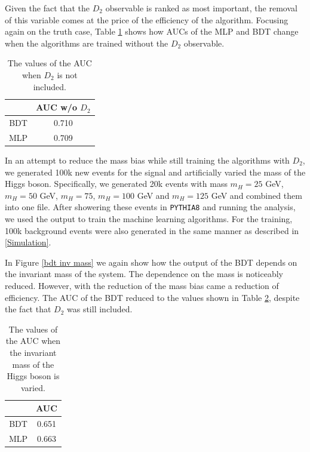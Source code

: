 \documentclass[10pt,a4paper]{book}
\def\code#1{\texttt{#1}}
\begin{document}
Given the fact that the $D_2$ observable is ranked as most important, the removal of this variable comes at the price of the efficiency of the algorithm. Focusing again on the truth case, Table \ref{AUC table no d2} shows how AUCs of the MLP and BDT change when the algorithms are trained without the $D_2$ observable.

\begin{table}[h!]
\centering
\begin{tabular}{|c|c|}
\hline 
\* & AUC w/o $D_2$ \\ 
\hline 
BDT &  0.710\\ 
\hline 
MLP &  0.709\\ 
\hline 
\end{tabular}
\caption{The values of the AUC when $D_2$ is not included.}
\label{AUC table no d2}
\end{table}

In an attempt to reduce the mass bias while still training the algorithms with $D_2$, we generated 100k new events for the signal and artificially varied the mass of the Higgs boson. Specifically, we generated 20k events with mass $m_H = 25$ GeV, $m_H = 50$ GeV, $m_H = 75$, $m_H = 100$ GeV and $m_H = 125$ GeV and combined them into one file. After showering these events in \code{PYTHIA8} and running the analysis, we used the output to train the machine learning algorithms. For the training, 100k background events were also generated in the same manner as described in \ref{Simulation}.

In Figure \ref{bdt inv mass} we again show how the output of the BDT depends on the invariant mass of the system. The dependence on the mass is noticeably reduced. However, with the reduction of the mass bias came a reduction of efficiency. The AUC of the BDT reduced to the values shown in Table \ref{AUC table mass bias}, despite the fact that $D_2$ was still included.

\begin{table}[h!]
\centering
\begin{tabular}{|c|c|}
\hline 
\* & AUC \\ 
\hline 
BDT & 0.651 \\ 
\hline 
MLP &  0.663\\ 
\hline 
\end{tabular}
\caption{The values of the AUC when the invariant mass of the Higgs boson is varied.}
\label{AUC table mass bias}
\end{table}
\end{document}
